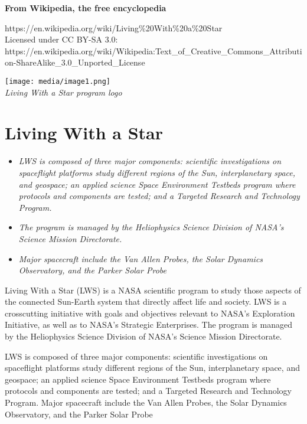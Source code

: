 \textbf{From Wikipedia, the free encyclopedia}

https://en.wikipedia.org/wiki/Living\%20With\%20a\%20Star\\
Licensed under CC BY-SA 3.0:\\
https://en.wikipedia.org/wiki/Wikipedia:Text\_of\_Creative\_Commons\_Attribution-ShareAlike\_3.0\_Unported\_License

\texttt{[image: media/image1.png]}\\
\emph{Living With a Star program logo}

\section{Living With a Star}\label{living-with-a-star}

\begin{itemize}
\item
  \emph{LWS is composed of three major components: scientific
  investigations on spaceflight platforms study different regions of the
  Sun, interplanetary space, and geospace; an applied science Space
  Environment Testbeds program where protocols and components are
  tested; and a Targeted Research and Technology Program.}
\item
  \emph{The program is managed by the Heliophysics Science Division of
  NASA's Science Mission Directorate.}
\item
  \emph{Major spacecraft include the Van Allen Probes, the Solar
  Dynamics Observatory, and the Parker Solar Probe}
\end{itemize}

Living With a Star (LWS) is a NASA scientific program to study those
aspects of the connected Sun-Earth system that directly affect life and
society. LWS is a crosscutting initiative with goals and objectives
relevant to NASA's Exploration Initiative, as well as to NASA's
Strategic Enterprises. The program is managed by the Heliophysics
Science Division of NASA's Science Mission Directorate.

LWS is composed of three major components: scientific investigations on
spaceflight platforms study different regions of the Sun, interplanetary
space, and geospace; an applied science Space Environment Testbeds
program where protocols and components are tested; and a Targeted
Research and Technology Program. Major spacecraft include the Van Allen
Probes, the Solar Dynamics Observatory, and the Parker Solar Probe


